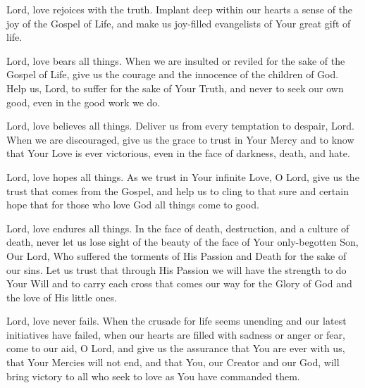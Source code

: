 Lord, love rejoices with the truth.
Implant deep within our hearts a sense of the joy of the Gospel of Life, and make us joy-filled evangelists of Your great gift of life.

Lord, love bears all things.
When we are insulted or reviled for the sake of the Gospel of Life, give us the courage and the innocence of the children of God.
Help us, Lord, to suffer for the sake of Your Truth, and never to seek our own good, even in the good work we do.

Lord, love believes all things.
Deliver us from every temptation to despair, Lord. When we are discouraged, give us the grace to trust in Your Mercy and to know that Your Love is ever victorious, even in the face of darkness, death, and hate.

Lord, love hopes all things.
As we trust in Your infinite Love, O Lord, give us the trust that comes from the Gospel, and help us to cling to that sure and certain hope that for those who love God all things come to good.

Lord, love endures all things.
In the face of death, destruction, and a culture of death, never let us lose sight of the beauty of the face of Your only-begotten Son, Our Lord, Who suffered the torments of His Passion and Death for the sake of our sins.
Let us trust that through His Passion we will have the strength to do Your Will and to carry each cross that comes our way for the Glory of God and the love of His little ones.

Lord, love never fails.
When the crusade for life seems unending and our latest initiatives have failed, when our hearts are filled with sadness or anger or fear, come to our aid, O Lord, and give us the assurance that You are ever with us, that Your Mercies will not end, and that You, our Creator and our God, will bring victory to all who seek to love as You have commanded them.

\newpage